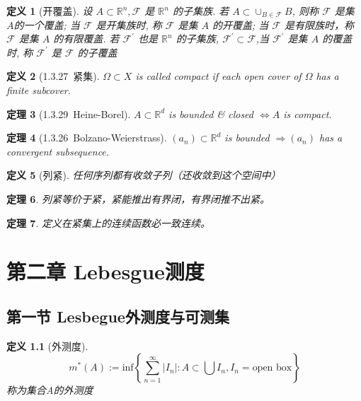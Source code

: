 \documentclass[10pt,openany]{book}
\theoremstyle{thmstyle} %
\newtheorem{theorem}{定理}[chapter]
\theoremstyle{defstyle} %
\newtheorem{definition}[theorem]{定义}
\theoremstyle{prostyle} %
\begin{document}
\begin{definition}[开覆盖]
设 $A \subset \mathbb{R}^n, \mathcal{F}$ 是 $\mathbb{R}^n$ 的子集族. 若 $A \subset \cup_{B \in \mathcal{F}} B$, 则称 $\mathcal{F}$ 是集 $A$的一个覆盖; 当 $\mathcal{F}$ 是开集族时, 称 $\mathcal{F}$ 是集 $A$ 的开覆盖; 当 $\mathcal{F}$ 是有限族时，称 $\mathcal{F}$ 是集 $A$ 的有限覆盖. 若 $\mathcal{F}^{\prime}$ 也是 $\mathbb{R}^n$ 的子集族, $\mathcal{F}^{\prime} \subset \mathcal{F}$,当 $\mathcal{F}^{\prime}$ 是集 $A$ 的覆盖时, 称 $\mathcal{F}^{\prime}$ 是 $\mathcal{F}$ 的子覆盖
\end{definition}

\begin{definition}[1.3.27~紧集]
$\Omega \subset X$ is called compact if each open cover of $\Omega$ has a finite subcover.
\end{definition}

\begin{theorem}[1.3.29~Heine-Borel]
$A \subset \mathbb{R}^d$ is bounded \& closed $\Leftrightarrow A$ is compact.
\end{theorem}

\begin{theorem}[1.3.26~Bolzano-Weierstrass]
$\left(a_n\right) \subset \mathbb{R}^d$ is bounded $\Rightarrow\left(a_n\right)$ has a convergent subsequence.
\end{theorem}

\begin{definition}[列紧]
任何序列都有收敛子列（还收敛到这个空间中）
\end{definition}

\begin{theorem}
列紧等价于紧，紧能推出有界闭，有界闭推不出紧。
\end{theorem}

\begin{theorem}
  定义在紧集上的连续函数必一致连续。
\end{theorem}


\chapter{第二章 Lebesgue测度}

\section{第一节 Lesbegue外测度与可测集}

\begin{definition}[外测度]
\begin{equation}
m^*(A) := \text{inf} \left\{\sum_{n=1}^{\infty} \left\vert I_n \right\vert : A \subset \bigcup I_n, I_n=\text{open box} \right\} 
\end{equation}
称为集合A的外测度
\end{definition}
\end{document}
